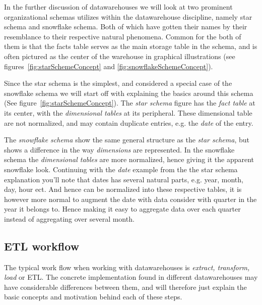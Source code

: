 	
	\bigskip\noindent
	In the further discussion of datawarehouses we will look at two prominent organizational schemas utilizes 
	within the datawarehouse discipline, namely star schema and snowflake schema. 
	Both of which have gotten their names by their resemblance to their respective natural phenomena.
	Common for the both of them is that the facts table serves as the main storage table in the schema, 
	and is often pictured as the center of the warehouse in graphical illustrations (see figures~\ref{fig:starSchemeConcept} and \ref{fig:snowflakeSchemeConcept}). 
	
	\bigskip\noindent
	Since the star schema is the simplest, and considered a special case of the snowflake schema
	we will start off with explaining the basics around this schema (See figure~\ref{fig:starSchemeConcept}). 
	The \textit{star schema} figure has the \textit{fact table} at its center, with the \textit{dimensional tables} at its peripheral. 
	These dimensional table are not normalized, and may contain duplicate entries, e.g. the \textit{date} of the entry.
		
	
	\bigskip\noindent
	The \textit{snowflake schema} show the same general structure as the \textit{star schema}, 
	but shows a difference in the way \textit{dimensions} are represented. 
	In the snowflake schema the \textit{dimensional tables} are more normalized, hence giving it the apparent snowflake look.
	Continuing with the \textit{date}	example from the the star schema explanation you'll note that dates has several natural 
	parts, e.g. year, month, day, hour ect. And hence can be normalized into these respective tables, 
	it is however more normal to augment the date with data consider with quarter in the year it belongs to. 
	Hence making it easy to aggregate data over each quarter instead of aggregating over several month.
	
	
	\subsection{ETL workflow}
		The typical work flow when working with datawarehouses is \textit{extract, transform, load} or ETL. 
		The concrete implementation found in different datawarehouses may have considerable differences between them, 
		and will therefore just explain the basic concepts and motivation behind each of these steps.
		
